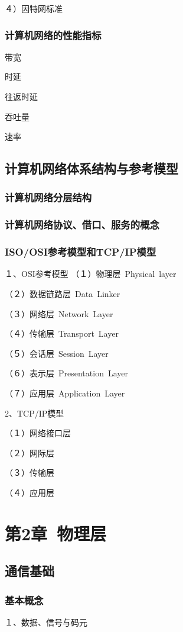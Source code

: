 \documentclass{ctexart}
\begin{document}
４）因特网标准

\subsubsection{计算机网络的性能指标}
带宽

时延

往返时延

吞吐量

速率

\subsection{计算机网络体系结构与参考模型}
\subsubsection{计算机网络分层结构}
\subsubsection{计算机网络协议、借口、服务的概念}
\subsubsection{ISO/OSI参考模型和TCP/IP模型}
１、OSI参考模型
（１）物理层~Physical~layer

（２）数据链路层~Data~Linker

（３）网络层~Network~Layer

（４）传输层~Transport~Layer

（５）会话层~Session~Layer

（６）表示层~Presentation~Layer

（７）应用层~Application~Layer

2、TCP/IP模型

（１）网络接口层

（２）网际层

（３）传输层

（４）应用层

\section{第2章\ 物理层}
\subsection{通信基础}
\subsubsection{基本概念}
１、数据、信号与码元
\end{document}
